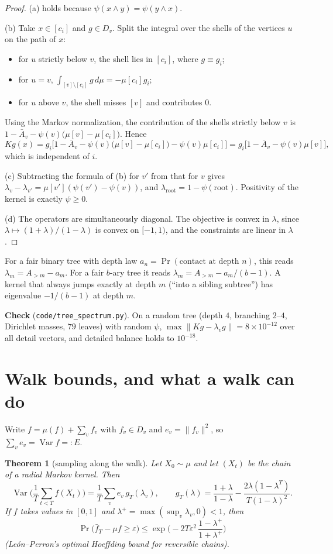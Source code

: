 \documentclass[11pt]{article}
\newtheorem{theorem}{Theorem}[section]
\theoremstyle{definition}
\theoremstyle{remark}
\newcommand{\Var}{\operatorname{Var}}
\begin{document}
\begin{proof}
(a) holds because $\psi(x\wedge y)=\psi(y\wedge x)$.

(b) Take $x\in[c_i]$ and $g\in D_v$. Split the integral over the shells of the vertices $u$ on the path of $x$:
\begin{itemize}
\item for $u$ strictly below $v$, the shell lies in $[c_i]$, where $g\equiv g_i$;
\item for $u=v$, $\int_{[v]\setminus[c_i]}g\,d\mu=-\mu[c_i]g_i$;
\item for $u$ above $v$, the shell misses $[v]$ and contributes $0$.
\end{itemize}
Using the Markov normalization, the contribution of the shells strictly below $v$ is $1-\bar A_v-\psi(v)\big(\mu[v]-\mu[c_i]\big)$. Hence
\[Kg(x)=g_i\Big[1-\bar A_v-\psi(v)\big(\mu[v]-\mu[c_i]\big)-\psi(v)\mu[c_i]\Big]=g_i\big[1-\bar A_v-\psi(v)\mu[v]\big],\]
which is independent of $i$.

(c) Subtracting the formula of (b) for $v'$ from that for $v$ gives $\lambda_v-\lambda_{v'}=\mu[v'](\psi(v')-\psi(v))$, and $\lambda_{\text{root}}=1-\psi(\text{root})$. Positivity of the kernel is exactly $\psi\ge0$.

(d) The operators are simultaneously diagonal. The objective is convex in $\lambda$, since $\lambda\mapsto(1+\lambda)/(1-\lambda)$ is convex on $[-1,1)$, and the constraints are linear in $\lambda$.
\end{proof}

For a fair binary tree with depth law $a_n=\Pr(\text{contact at depth }n)$, this reads $\lambda_m=A_{>m}-a_m$. For a fair $b$-ary tree it reads $\lambda_m=A_{>m}-a_m/(b-1)$. A kernel that always jumps exactly at depth $m$ (``into a sibling subtree'') has eigenvalue $-1/(b-1)$ at depth $m$.

\textbf{Check} (\texttt{code/tree\_spectrum.py}). On a random tree (depth $4$, branching $2$--$4$, Dirichlet masses, $79$ leaves) with random $\psi$, $\max\|Kg-\lambda_vg\|=8\times10^{-12}$ over all detail vectors, and detailed balance holds to $10^{-18}$.

\section{Walk bounds, and what a walk can do}

Write $f=\mu(f)+\sum_vf_v$ with $f_v\in D_v$ and $e_v=\|f_v\|^2$, so $\sum_ve_v=\Var f=:E$.

\begin{theorem}[sampling along the walk]\label{thm:walk}
Let $X_0\sim\mu$ and let $(X_t)$ be the chain of a radial Markov kernel. Then
\[\Var\Big(\frac1T\sum_{t<T}f(X_t)\Big)=\frac1T\sum_ve_v\,g_T(\lambda_v),\qquad g_T(\lambda)=\frac{1+\lambda}{1-\lambda}-\frac{2\lambda(1-\lambda^T)}{T(1-\lambda)^2}.\]
If $f$ takes values in $[0,1]$ and $\lambda^+=\max(\sup_v\lambda_v,0)<1$, then
\[\Pr\big(\bar f_T-\mu f\ge\varepsilon\big)\le\exp\!\Big(-2T\varepsilon^2\,\frac{1-\lambda^+}{1+\lambda^+}\Big)\]
(León--Perron's optimal Hoeffding bound for reversible chains).
\end{theorem}
\end{document}
